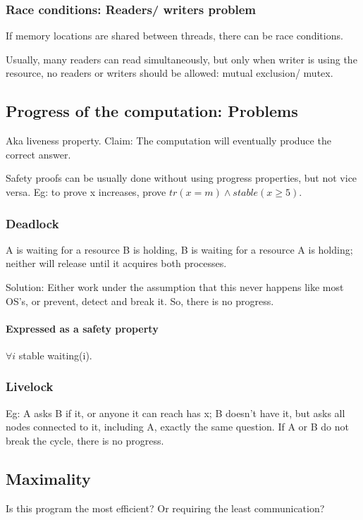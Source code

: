 \documentclass[oneside, article]{memoir}
\begin{document}
\subsubsection{Race conditions: Readers/ writers problem}
If memory locations are shared between threads, there can be race conditions.

Usually, many readers can read simultaneously, but only when writer is using the resource, no readers or writers should be allowed: mutual exclusion/ mutex.

\subsection{Progress of the computation: Problems}
Aka liveness property. Claim: The computation will eventually produce the correct answer.

Safety proofs can be usually done without using progress properties, but not vice versa. Eg: to prove x increases, prove $tr(x = m) \land stable(x \geq 5)$.

\subsubsection{Deadlock}
A is waiting for a resource B is holding, B is waiting for a resource A is holding; neither will release until it acquires both processes.

Solution: Either work under the assumption that this never happens like most OS's, or prevent, detect and break it. So, there is no progress.

\paragraph*{Expressed as a safety property}
$\forall i$ stable waiting(i).

\subsubsection{Livelock}
Eg: A asks B if it, or anyone it can reach has x; B doesn't have it, but asks all nodes connected to it, including A, exactly the same question. If A or B do not break the cycle, there is no progress.

\subsection{Maximality}
Is this program the most efficient? Or requiring the least communication?
\end{document}

